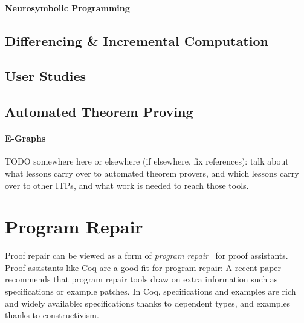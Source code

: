 \paragraph{Neurosymbolic Programming}

\subsection{Differencing \& Incremental Computation}
\label{sec:diff-incremental}

\subsection{User Studies}
\label{sec:user-studies}

\subsection{Automated Theorem Proving}
\label{sec:atp}


\paragraph{E-Graphs}

\iffalse

TODO somewhere here or elsewhere (if elsewhere, fix references): talk about what lessons carry over to automated theorem provers,
and which lessons carry over to other ITPs, and what work is needed to reach those tools.

\section{Program Repair}


Proof repair can be viewed as a form of \textit{program repair}~\cite{Monperrus:2018:ASR:3177787.3105906, Gazzola:2018:ASR:3180155.3182526}
for proof assistants.
Proof assistants like Coq are a good fit for program repair: A recent paper~\cite{Qi:2015:APP:2771783.2771791} 
recommends that program repair tools draw on extra information
such as specifications or example patches. In Coq, specifications and examples 
are rich and widely available: specifications thanks to dependent types,
and examples thanks to constructivism.


